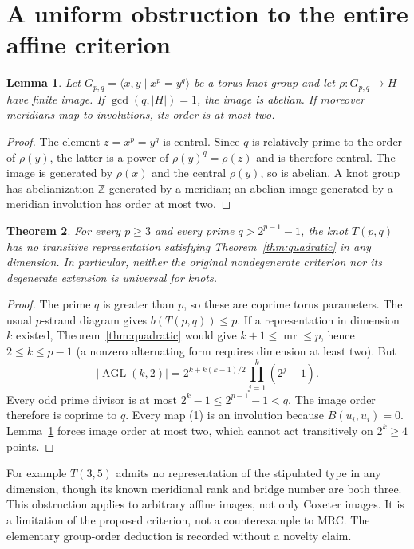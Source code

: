 \documentclass[11pt]{article}
\newtheorem{theorem}{Theorem}
\newtheorem{lemma}[theorem]{Lemma}
\newcommand{\mr}{\operatorname{mr}}
\begin{document}
\section{A uniform obstruction to the entire affine criterion}

\begin{lemma}\label{lem:torus}
Let $G_{p,q}=\langle x,y\mid x^p=y^q\rangle$ be a torus knot group and
let $\rho:G_{p,q}\to H$ have finite image. If $\gcd(q,|H|)=1$, the image
is abelian. If moreover meridians map to involutions, its order is at
most two.
\end{lemma}
\begin{proof}
The element $z=x^p=y^q$ is central. Since $q$ is relatively prime to
the order of $\rho(y)$, the latter is a power of $\rho(y)^q=\rho(z)$
and is therefore central. The image is generated by $\rho(x)$ and the
central $\rho(y)$, so is abelian. A knot group has abelianization $\mathbb Z$
generated by a meridian; an abelian image generated by a meridian
involution has order at most two.
\end{proof}

\begin{theorem}\label{thm:nouniversal}
For every $p\ge3$ and every prime $q>2^{p-1}-1$, the knot $T(p,q)$
has no transitive representation satisfying Theorem~\ref{thm:quadratic}
in any dimension. In particular, neither the original nondegenerate
criterion nor its degenerate extension is universal for knots.
\end{theorem}
\begin{proof}
The prime $q$ is greater than $p$, so these are coprime torus parameters.
The usual $p$-strand diagram gives $b(T(p,q))\le p$. If a representation
in dimension $k$ existed, Theorem~\ref{thm:quadratic} would give
$k+1\le\mr\le p$, hence $2\le k\le p-1$ (a nonzero alternating form
requires dimension at least two). But
\[
 |\operatorname{AGL}(k,2)|
   =2^{k+k(k-1)/2}\prod_{j=1}^{k}(2^j-1).
\]
Every odd prime divisor is at most $2^k-1\le2^{p-1}-1<q$.
The image order therefore is coprime to $q$.
Every map (1) is an involution because $B(u_i,u_i)=0$.
Lemma~\ref{lem:torus} forces image order at most two, which cannot
act transitively on $2^k\ge4$ points.
\end{proof}

For example $T(3,5)$ admits no representation of the stipulated type
in any dimension, though its known meridional rank and bridge number
are both three. This obstruction applies to arbitrary affine images,
not only Coxeter images. It is a limitation of the proposed criterion,
not a counterexample to MRC. The elementary group-order deduction is
recorded without a novelty claim.
\end{document}
